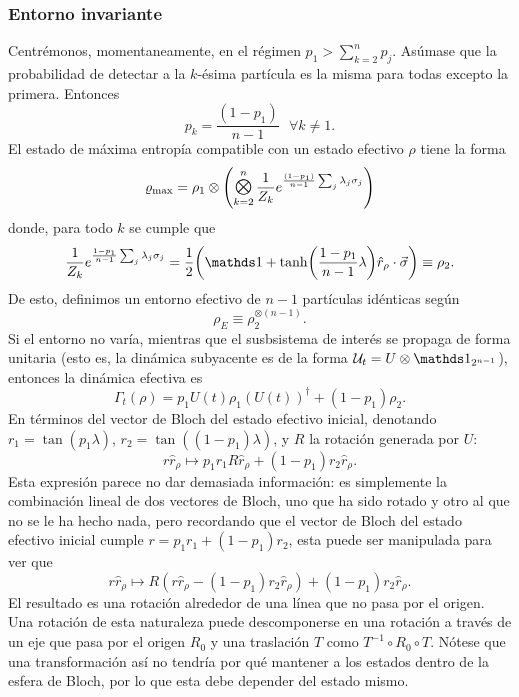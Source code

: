 \subsubsection{Entorno invariante}

Centrémonos, momentaneamente, en el régimen $p_{1}>\sum_{k=2}^{n}p_{j}$. Asúmase que la probabilidad de detectar a la $k$-ésima partícula es la misma para todas excepto la primera. Entonces
\begin{equation*}
    p_{k}=\frac{(1-p_{1})}{n-1}\text{ }\forall k\neq 1.
\end{equation*}
El estado de máxima entropía compatible con un estado efectivo $\rho$ tiene la forma
\begin{equation*}
    \varrho_{\max}=\rho_{1}\otimes\qty(\Motimes_{k=2}^{n}\frac{1}{Z_{k}}e^{\frac{(1-p_{1})}{n-1}\sum_{j}\lambda_{j}\pauli{j}})
\end{equation*}
donde, para todo $k$ se cumple que
\begin{equation*}
    \frac{1}{Z_{k}}e^{\frac{1-p_{1}}{n-1}\sum_{j}\lambda_{j}\pauli{j}}=\frac{1}{2}\qty(\Id+\tanh(\frac{1-p_{1}}{n-1}\lambda)\hat{r}_{\rho}\cdot\vec{\sigma})\equiv \rho_{2}.
\end{equation*}
De esto, definimos un entorno efectivo de $n-1$ partículas idénticas según
\begin{equation*}
    \rho_{E}\equiv\rho_{2}^{\otimes(n-1)}.
\end{equation*}
Si el entorno no varía, mientras que el susbsistema de interés se propaga de forma unitaria (esto es, la dinámica subyacente es de la forma $\mcU_{t}=U\otimes\Id_{2^{n-1}}$), entonces la dinámica efectiva es
\begin{equation*}
    \Gamma_{t}(\rho)=p_{1}U(t)\rho_{1}(U(t))^{\dag}+(1-p_{1})\rho_{2}.
\end{equation*}
En términos del vector de Bloch del estado efectivo inicial, denotando $r_{1}=\tan(p_{1}\lambda)$, $r_{2}=\tan((1-p_{1})\lambda)$, y $R$ la rotación generada por $U$:
\begin{equation*}
    r\hat{r}_{\rho}\mapsto p_{1}r_{1}R\hat{r}_{\rho}+(1-p_{1})r_{2}\hat{r}_{\rho}.
\end{equation*}
Esta expresión parece no dar demasiada información: es simplemente la combinación lineal de dos vectores de Bloch, uno que ha sido rotado y otro al que no se le ha hecho nada, pero recordando que el vector de Bloch del estado efectivo inicial cumple $r=p_{1}r_{1}+(1-p_{1})r_{2}$, esta puede ser manipulada para ver que
\begin{equation*}
    r\hat{r}_{\rho}\mapsto R(r\hat{r}_{\rho}-(1-p_{1})r_{2}\hat{r}_{\rho})+(1-p_{1})r_{2}\hat{r}_{\rho}.
\end{equation*}
El resultado es una rotación alrededor de una línea que no pasa por el origen. Una rotación de esta naturaleza puede descomponerse en una rotación a través de un eje que pasa por el origen $R_{0}$ y una traslación $T$ como $T^{-1}\circ R_{0}\circ T$. Nótese que una transformación así no tendría por qué mantener a los estados dentro de la esfera de Bloch, por lo que esta debe depender del estado mismo. 

